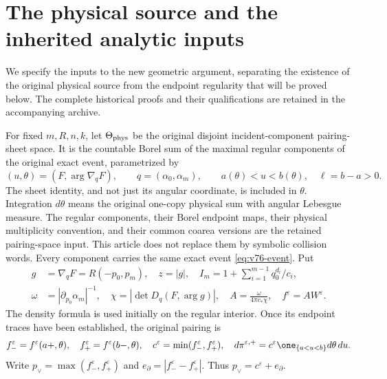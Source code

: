 \section{The physical source and the inherited analytic inputs}
\label{sec:v109-inputs}
We specify the inputs to the new geometric argument, separating the
existence of the original physical source from the endpoint regularity
that will be proved below. The complete historical proofs and their
qualifications are retained in the accompanying archive.

For fixed $m,R,n,k$, let $\Theta_{\rm phys}$ be the original disjoint
incident-component pairing-sheet space. It is the countable Borel
sum of the maximal regular components of the original exact event,
parametrized by
\[
 (u,\theta)=(F,\arg\nabla_qF),\qquad q=(\alpha_0,\alpha_m),
 \qquad a(\theta)<u<b(\theta),\quad \ell=b-a>0.
\]
The sheet identity, and not just its angular coordinate, is included
in $\theta$. Integration $d\theta$ means the original one-copy
physical sum with angular Lebesgue measure. The regular components,
their Borel endpoint maps, their physical multiplicity convention,
and their common coarea versions are the retained pairing-space
input. This article does not replace them by symbolic collision words.
Every component carries the same exact event \eqref{eq:v76-event}.
Put
\begin{equation}\label{eq:v109-density}
 \begin{split}
 g&=\nabla_qF=R(-p_0,p_m),\quad z=|g|,
 \quad I_m=1+\sum_{i=1}^{m-1}q_0^{d_i}/c_i,\\
 \omega&=|\partial_{p_0}\alpha_m|^{-1},\quad
 \chi=|\det D_q(F,\arg g)|,\quad
 A=\frac{\omega}{4\pi c_*\chi},\quad f^\varepsilon=AW^\varepsilon.
 \end{split}
\end{equation}
The density formula is used initially on the regular interior.
Once its endpoint traces have been established, the original pairing
is
\begin{equation}\label{eq:v109-paired}
 f_-^\varepsilon=f^\varepsilon(a+,\theta),\quad
 f_+^\varepsilon=f^\varepsilon(b-,\theta),\quad
 c^\varepsilon=\min(f_-^\varepsilon,f_+^\varepsilon),\quad
 d\pi^{\varepsilon,+}=c^\varepsilon\one_{\{a<u<b\}}d\theta\,du.
\end{equation}
Write $p_\vee=\max(f_-^\varepsilon,f_+^\varepsilon)$ and
$e_\partial=|f_-^\varepsilon-f_+^\varepsilon|$.
Thus $p_\vee=c^\varepsilon+e_\partial$.

